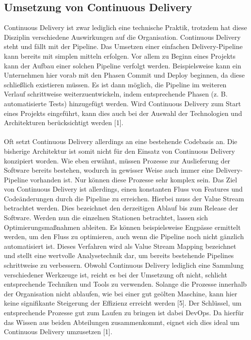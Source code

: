 \subsection{Umsetzung von Continuous Delivery}
Continuous Delivery ist zwar lediglich eine technische Praktik, trotzdem hat diese Disziplin verschiedene Auswirkungen auf die Organisation. Continuous Delivery steht und fällt mit der Pipeline. Das Umsetzen einer einfachen Delivery-Pipeline kann bereits mit simplen mitteln erfolgen. Vor allem zu Beginn eines Projekts kann der Aufbau einer solchen Pipeline verfolgt werden. Beispielsweise kann ein Unternehmen hier vorab mit den Phasen Commit und Deploy beginnen, da diese schließlich existieren müssen. Es ist dann möglich, die Pipeline im weiteren Verlauf schrittweise weiterzuentwickeln, indem entsprechende Phasen (z. B. automatisierte Tests) hinzugefügt werden. Wird Continuous Delivery zum Start eines Projekts eingeführt, kann dies auch bei der Auswahl der Technologien und Architekturen berücksichtigt werden [1]. \\ \\
Oft setzt Continuous Delivery allerdings an eine bestehende Codebasis an. Die bisherige Architektur ist somit nicht für den Einsatz von Continuous Delivery konzipiert worden. Wie eben erwähnt, müssen Prozesse zur Auslieferung der Software bereits bestehen, wodurch in gewisser Weise auch immer eine Delivery-Pipeline vorhanden ist. Nur können diese Prozesse sehr komplex sein. Das Ziel von Continuous Delivery ist allerdings, einen konstanten Fluss von Features und Codeänderungen durch die Pipeline zu erreichen. Hierbei muss der Value Stream betrachtet werden. Dies bezeichnet den derzeitigen Ablauf bis zum Release der Software. Werden nun die einzelnen Stationen betrachtet, lassen sich Optimierungsmaßnahmen ableiten. Es können beispielsweise Engpässe ermittelt werden, um den Fluss zu optimieren, auch wenn die Pipeline noch nicht gänzlich automatisiert ist. Dieses Verfahren wird als Value Stream Mapping bezeichnet und stellt eine wertvolle Analysetechnik dar, um bereits bestehende Pipelines schrittweise zu verbessern. Obwohl Continuous Delivery lediglich eine Sammlung verschiedener Werkzeuge ist, reicht es bei der Umsetzung oft nicht, schlicht entsprechende Techniken und Tools zu verwenden. Solange die Prozesse innerhalb der Organisation nicht ablaufen, wie bei einer gut geölten Maschine, kann hier keine signifikante Steigerung der Effizienz erreicht werden [5]. Der Schlüssel, um entsprechende Prozesse gut zum Laufen zu bringen ist dabei DevOps. Da hierfür das Wissen aus beiden Abteilungen zusammenkommt, eignet sich dies ideal um Continuous Delivery umzusetzen [1].

